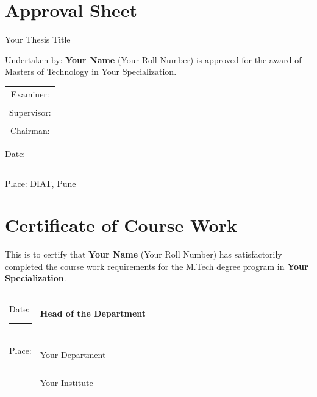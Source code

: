 \documentclass[12pt,a4paper]{report}
\newcommand{\thesistitle}{Your Thesis Title}
\newcommand{\authorname}{Your Name}
\newcommand{\rollnumber}{Your Roll Number}
\newcommand{\departmentname}{Your Department}
\newcommand{\institutename}{Your Institute}
\newcommand{\specialization}{Your Specialization}
\begin{document}
\cleardoublepage
\chapter*{Approval Sheet}

\begin{center}
\thesistitle
\end{center}

\vspace{1cm}

Undertaken by: \textbf{\authorname} (\rollnumber) is approved for the award of Masters of Technology in \specialization.
\vspace{2cm}

\begin{flushright}
\begin{tabular}{c}
Examiner: \hspace{3cm}\\[1cm]
\\
Supervisor: \hspace{3cm}\\[1cm]
\\
Chairman: \hspace{3cm}\\[1cm]
\end{tabular}
\end{flushright}

\vspace{2cm}

\noindent Date: \rule{3cm}{0.4pt}

\vspace{1cm}

\noindent Place: DIAT, Pune

\cleardoublepage
\chapter*{Certificate of Course Work}

This is to certify that \textbf{\authorname} (\rollnumber) has satisfactorily completed the course work requirements for the M.Tech degree program in \textbf{\specialization}.

\vspace{2cm}

\noindent\begin{tabular}{@{}p{}p{}@{}}
Date: \rule{3cm}{0.4pt} & \hfill\textbf{Head of the Department}\hspace{0pt}\\[0.2cm]
Place: \rule{3cm}{0.4pt} & \hfill\departmentname\hspace{0pt}\\[0.2cm]
& \hfill\institutename\hspace{0pt}
\end{tabular}
\end{document}
